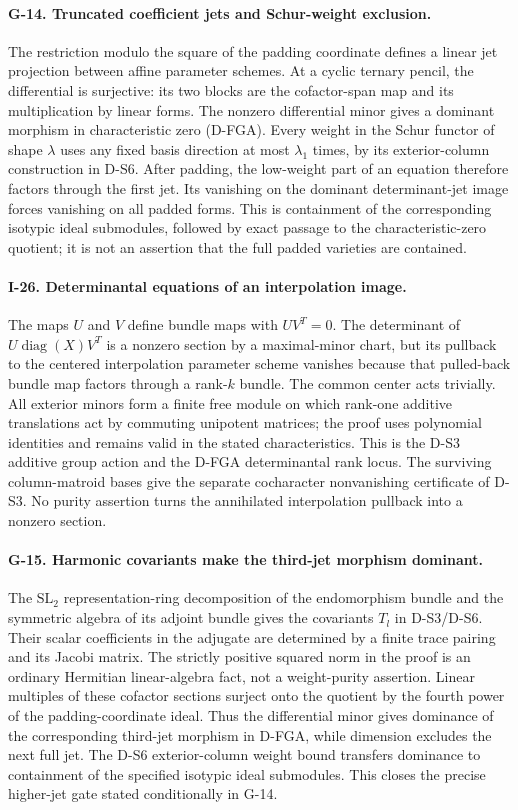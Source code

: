 \paragraph{G-14. Truncated coefficient jets and Schur-weight exclusion.}
The restriction modulo the square of the padding coordinate defines a linear
jet projection between affine parameter schemes. At a cyclic ternary pencil,
the differential is surjective: its two blocks are the cofactor-span map and
its multiplication by linear forms. The nonzero differential minor gives a
dominant morphism in characteristic zero (D-FGA). Every weight in the Schur
functor of shape $\lambda$ uses any fixed basis direction at most
$\lambda_1$ times, by its exterior-column construction in D-S6. After padding,
the low-weight part of an equation therefore factors through the first jet.
Its vanishing on the dominant determinant-jet image forces vanishing on all
padded forms. This is containment of the corresponding isotypic ideal
submodules, followed by exact passage to the characteristic-zero quotient;
it is not an assertion that the full padded varieties are contained.

\paragraph{I-26. Determinantal equations of an interpolation image.}
The maps $U$ and $V$ define bundle maps with $UV^T=0$. The determinant of
$U\operatorname{diag}(X)V^T$ is a nonzero section by a maximal-minor chart,
but its pullback to the centered interpolation parameter scheme vanishes
because that pulled-back bundle map factors through a rank-$k$ bundle.
The common center acts trivially. All exterior minors form a finite free
module on which rank-one additive translations act by commuting unipotent
matrices; the proof uses polynomial identities and remains valid in the
stated characteristics. This is the D-S3 additive group action and the
D-FGA determinantal rank locus. The surviving column-matroid bases give the
separate cocharacter nonvanishing certificate of D-S3. No purity assertion
turns the annihilated interpolation pullback into a nonzero section.


\paragraph{G-15. Harmonic covariants make the third-jet morphism dominant.}
The $\mathrm{SL}_2$ representation-ring decomposition of the endomorphism
bundle and the symmetric algebra of its adjoint bundle gives the covariants
$T_l$ in D-S3/D-S6. Their scalar coefficients in the adjugate are determined
by a finite trace pairing and its Jacobi matrix. The strictly positive
squared norm in the proof is an ordinary Hermitian linear-algebra fact,
not a weight-purity assertion. Linear multiples of these cofactor sections
surject onto the quotient by the fourth power of the padding-coordinate
ideal. Thus the differential minor gives dominance of the corresponding
third-jet morphism in D-FGA, while dimension excludes the next full jet.
The D-S6 exterior-column weight bound transfers dominance to containment
of the specified isotypic ideal submodules. This closes the precise
higher-jet gate stated conditionally in G-14.

